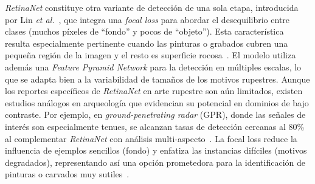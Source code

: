 \textit{RetinaNet} constituye otra variante de detección de una sola etapa, introducida por Lin \textit{et al.}~\cite{lin2017focal}, que integra una \textit{focal loss} para abordar el desequilibrio entre clases (muchos píxeles de “fondo” y pocos de “objeto”). Esta característica resulta especialmente pertinente cuando las pinturas o grabados cubren una pequeña región de la imagen y el resto es superficie rocosa~\cite{sharp2024}. El modelo utiliza además una \textit{Feature Pyramid Network} para la detección en múltiples escalas, lo que se adapta bien a la variabilidad de tamaños de los motivos rupestres. Aunque los reportes específicos de \textit{RetinaNet} en arte rupestre son aún limitados, existen estudios análogos en arqueología que evidencian su potencial en dominios de bajo contraste. Por ejemplo, en \textit{ground-penetrating radar} (GPR), donde las señales de interés son especialmente tenues, se alcanzan tasas de detección cercanas al 80\% al complementar \textit{RetinaNet} con análisis multi-aspecto~\cite{esri_retinanet}. La focal loss reduce la influencia de ejemplos sencillos (fondo) y enfatiza las instancias difíciles (motivos degradados), representando así una opción prometedora para la identificación de pinturas o carvados muy sutiles~\cite{wunderlich2023}.

